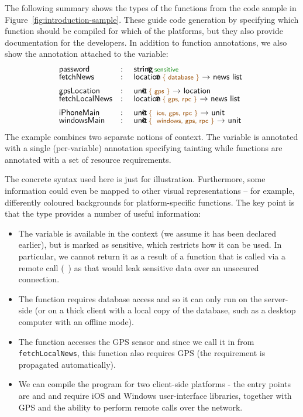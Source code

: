 The following summary shows the types of the functions from the code sample in
Figure~\ref{fig:introduction-sample}. These guide code generation by specifying which
function should be compiled for which of the platforms, but they also provide documentation
for the developers. In addition to function annotations, we also show the annotation attached
to the  variable:
%
\begin{equation*}
\begin{array}{lcl}
 \ident{password} &:& $\introvar{string}{sensitive}$\\[-0.25em]
 \ident{fetchNews} &:& $\introfunc{location}{database}{news~list}$\\[0.5em]
 \ident{gpsLocation} &:& $\introfunc{unit}{gps}{location}$\\[-0.25em]
 \ident{fetchLocalNews} &:& $\introfunc{location}{gps, rpc}{news~list}$\\[0.5em]
 \ident{iPhoneMain} &:& $\introfunc{unit}{ ios, gps, rpc}{unit}$\\[-0.25em]
 \ident{windowsMain} &:& $\introfunc{unit}{ windows, gps, rpc}{unit}$
\end{array}
\end{equation*}
%
The example combines two separate notions of context. The variable  is annotated 
with a single (per-variable) annotation specifying tainting while
functions are annotated with a set of resource requirements. 

The concrete syntax used here is just for illustration. Furthermore,
some information could even be mapped to other visual representations -- for example, differently
coloured backgrounds for platform-specific functions. The key point is that the type provides a
number of useful information:

\begin{itemize}
\item The  variable is available in the context (we assume it has been declared
  earlier), but is marked as sensitive, which restricts how it can be used. In particular, we
  cannot return it as a result of a function that is called via a remote call (\eg~)
  as that would leak sensitive data over an unsecured connection.

\item The  function requires database access and so it can only run on the server-side
  (or on a thick client with a local copy of the database, such as a desktop computer with an offline mode).

\item The  function accesses the GPS sensor and since we call it in
  from \texttt{fetchLocalNews}, this function also requires GPS (the requirement is propagated
  automatically).

\item We can compile the program for two client-side platforms - the entry points are 
  and  and require iOS and Windows user-interface libraries, together with
  GPS and the ability to perform remote calls over the network.
\end{itemize}

